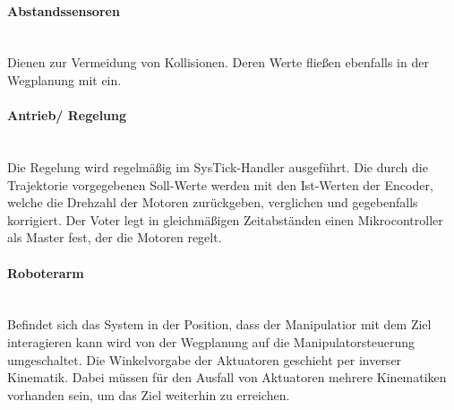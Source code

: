 \paragraph{Abstandssensoren}$\;$\\
Dienen zur Vermeidung von Kollisionen. Deren Werte fließen ebenfalls in der Wegplanung mit ein.

\paragraph{Antrieb/ Regelung}$\;$\\
Die Regelung wird regelmäßig im SysTick-Handler ausgeführt. Die durch die Trajektorie vorgegebenen Soll-Werte werden mit den Ist-Werten der Encoder, welche die Drehzahl der Motoren zurückgeben, verglichen und gegebenfalls korrigiert. Der Voter legt in gleichmäßigen Zeitabständen einen Mikrocontroller als Master fest, der die Motoren regelt.

\paragraph{Roboterarm}$\;$\\
Befindet sich das System in der Position, dass der Manipulatior mit dem Ziel interagieren kann wird von der Wegplanung auf die Manipulatorsteuerung umgeschaltet. Die Winkelvorgabe der Aktuatoren geschieht per inverser Kinematik. Dabei müssen für den Ausfall von Aktuatoren mehrere Kinematiken vorhanden sein, um das Ziel weiterhin zu erreichen.
 
